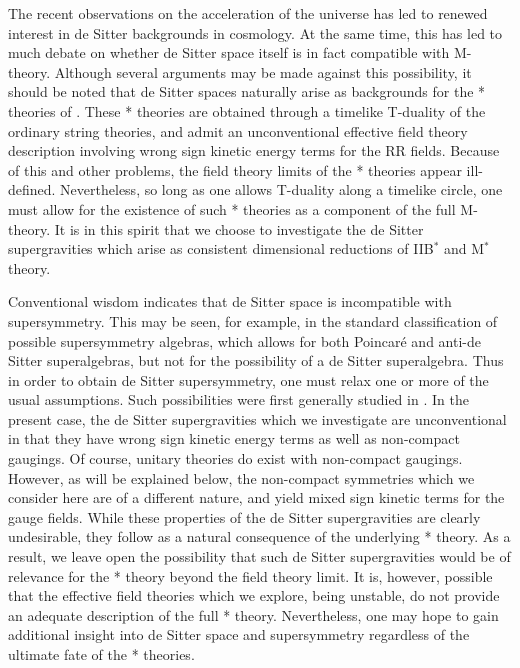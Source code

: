 \documentclass[a4paper,12pt]{article}
\begin{document}
The recent observations on the acceleration of the universe has led to
renewed interest in de Sitter backgrounds in cosmology.  At the same
time, this has led to much debate on whether de Sitter space itself is
in fact compatible with M-theory.  Although several arguments may be
made against this possibility, it should be noted that de Sitter spaces
naturally arise as backgrounds for the * theories of
\cite{Hull:1998vg,Hull2,Hull3,Hull4,Hull}.  These * theories are obtained
through a timelike T-duality of the ordinary string theories, and admit an
unconventional effective field theory description involving wrong sign
kinetic energy terms for the RR fields.  Because of this and other
problems, the field theory limits of the * theories appear ill-defined.
Nevertheless, so long as one allows T-duality along a timelike circle,
one must allow for the existence of such * theories as a component of the
full M-theory.  It is in this spirit that we choose to investigate the
de Sitter supergravities which arise as consistent dimensional
reductions of IIB$^*$ and M$^*$ theory.

Conventional wisdom indicates that de Sitter space is
incompatible with supersymmetry.  This may be seen, for example, in
the standard classification of possible supersymmetry algebras, which allows
for both Poincar\'e and anti-de Sitter superalgebras, but not for the
possibility of a de Sitter superalgebra.  Thus in order to obtain de
Sitter supersymmetry, one must relax one or more of the usual assumptions.
Such possibilities were first generally studied in \cite{Lukierski,Pilch}.
In the present case, the de Sitter supergravities which we investigate
are unconventional in that they have wrong sign kinetic energy terms
as well as non-compact gaugings.  Of course, unitary theories do exist
with non-compact gaugings.  However, as will be explained below, the
non-compact symmetries which we consider here are of a different
nature, and yield mixed sign kinetic terms for the gauge fields.
While these properties of the de Sitter supergravities are clearly
undesirable, they follow as a natural consequence of the underlying *
theory.  As a result, we leave open the possibility that such de Sitter
supergravities would be of relevance for the * theory beyond the
field theory limit.  It is, however, possible that the effective field
theories which we explore, being unstable, do not provide an adequate
description of the full * theory.  Nevertheless, one may hope to gain
additional insight into de Sitter space and supersymmetry regardless of
the ultimate fate of the * theories.
\end{document}

